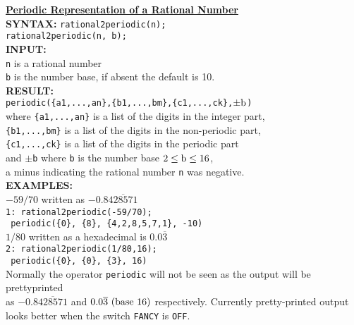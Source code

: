 \begin{tabbing}
\textbf{\underline{Periodic Representation of a Rational Number}}\\[\baselineskip]

\textbf{SYNTAX:} \hspace{3mm} 
       \= \texttt{rational2periodic(n);}\\
\> {\tt rational2periodic(n, b);}\\[\baselineskip]

\textbf{INPUT:}\\  
\> \texttt{n} \hspace{3mm} is a rational number\\
\> {\tt b} \hspace{3mm} is the number base, if absent the default is 10.\\[\baselineskip]

\textbf{RESULT:}\\
     \> {\tt periodic(\{a1,...,an\},\{b1,...,bm\},\{c1,...,ck\},$\pm{\rm b}$)}\\
 \> where  {\tt\{a1,...,an\}} is a list of the digits in the integer part,\\
 \> {\tt\{b1,...,bm\}} is a list of the digits in the non-periodic part,\\
 \> {\tt\{c1,...,ck\}} is a list of the digits in the periodic part\\
 \> and $\pm${\tt b} where {\tt b} is the number base $2 \leq {\rm b} \leq 16$, \\
 \> a minus indicating the rational number {\tt n} was negative. \\[\baselineskip]

\textbf{EXAMPLES:}\\
    \> $-59/70$ written as $-0.8\overline{428571}$\\
    \>  \texttt{1: rational2periodic(-59/70);}\\
    \> \texttt{ periodic(\{0\}, \{8\}, \{4,2,8,5,7,1\}, -10)}\\[\baselineskip]
    \> $1/80$ written as a hexadecimal is $0.0\overline{3}$\\
    \>  \texttt{2: rational2periodic(1/80,16);}\\
    \> \texttt{ periodic(\{0\}, \{0\}, \{3\}, 16)}\\[\baselineskip]

    Normally the operator {\tt periodic} will not be seen as the output will
    be prettyprinted\\
    as $-0.8\overline{428571}$ and $0.0\overline{3}\ {\rm (base\ 16)}$
    respectively. Currently pretty-printed output \\
    looks better when the switch \texttt{FANCY} is \texttt{OFF}.\\
\end{tabbing}
